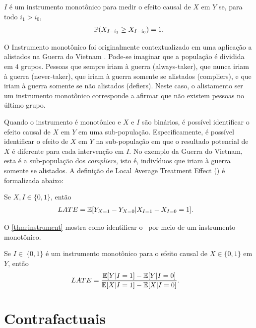 \begin{definition}
 \label{def:monotone}
 $I$ é um instrumento monotônico para
 medir o efeito causal de $X$ em $Y$ se,
 para todo $i_1 > i_0$,
 \begin{align*}
  \P(X_{I = i_1} \geq X_{I = i_0}) = 1.
 \end{align*}
\end{definition}

O Instrumento monotônico foi originalmente contextualizado
em uma aplicação a alistados na Guerra do Vietnam \cite{Angrist1990}.
Pode-se imaginar que a população é dividida em $4$ grupos.
Pessoas que sempre iriam à guerra (always-taker),
que nunca iriam à guerra (never-taker),
que iriam à guerra somente se alistados (compliers),
e que iriam à guerra somente se não alistados (defiers).
Neste caso, o alistamento ser um instrumento monotônico corresponde
a afirmar que não existem pessoas no último grupo.

Quando o instrumento é monotônico e
$X$ e $I$ são binários, é
possível identificar o efeito causal de
$X$ em $Y$ em uma sub-população.
Especificamente, é possível identificar
o efeito de $X$ em $Y$ na sub-população em que
o resultado potencial de $X$ é
diferente para cada intervenção em $I$.
No exemplo da Guerra do Vietnam,
esta é a sub-população dos \textit{compliers}, isto é,
indivíduos que iriam à guerra somente se alistados.
A definição de Local Average Treatment Effect (\LACE)
é formalizada abaixo:

\begin{definition}
 \label{def:lace}
 Se $X, I \in \{0,1\}$, então
 \begin{align*}
  \LACE &= \E[Y_{X=1}-Y_{X=0}|X_{I=1}-X_{I=0} = 1].
 \end{align*}
\end{definition}

O \cref{thm:instrument} mostra como
identificar o \LACE \ por meio de um instrumento monotônico.

\begin{theorem}
 \label{thm:instrument}
 Se $I \in\ \{0,1\}$ é um instrumento monotônico para
 o efeito causal de $X \in \{0,1\}$ em $Y$, então
 \begin{align*}
  \LACE &= \frac{\E[Y|I=1]-\E[Y|I=0]}{\E[X|I=1]-\E[X|I=0]}.
 \end{align*}
\end{theorem}

\section{Contrafactuais}
\label{sec:contrafactuais}

